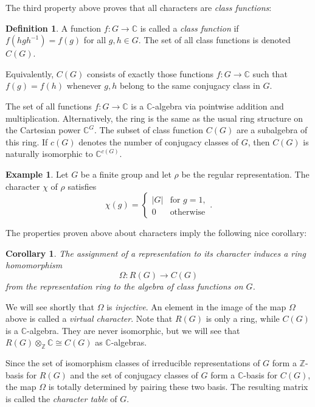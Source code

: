 \documentclass[12pt]{article}
\theoremstyle{plain}
\newtheorem{corollary}[theorem]{Corollary}
\theoremstyle{definition}
\newtheorem{definition}[theorem]{Definition}
\newtheorem{example}[theorem]{Example}
\theoremstyle{remark}
\numberwithin{equation}{section}
\begin{document}
The third property above proves that all characters are \emph{class
functions}:

\begin{definition}
A function $f : G \to \mathbb{C}$ is called a \emph{class function}
if $f(hgh^{-1})=f(g)$ for all $g,h \in G$.
The set of all class functions is denoted $C(G)$.
\end{definition}

Equivalently, $C(G)$ consists of exactly those functions $f : G \to
\mathbb{C}$ such that $f(g)=f(h)$ whenever $g, h$ belong to the
same conjugacy class in $G$.

The set of all functions $f : G \to \mathbb{C}$ is a
$\mathbb{C}$-algebra via pointwise addition and multiplication.
Alternatively, the ring is the same as the usual ring structure on the
Cartesian power $\mathbb{C}^G$.
The subset of class function $C(G)$ are a subalgebra of this ring.
If $c(G)$ denotes the number of conjugacy classes of $G$,
then $C(G)$ is naturally isomorphic to $\mathbb{C}^{c(G)}$.

\begin{example}
Let $G$ be a finite group and let $\rho$ be the regular representation.
The character $\chi$ of $\rho$ satisfies
\[
\chi(g) = \begin{cases}
|G| & \textrm{for $g=1$},\\
0 & \textrm{otherwise}
\end{cases} .
\]
\end{example}

The properties proven above about characters imply the following nice
corollary:

\begin{corollary}
The assignment of a representation to its character
induces a ring homomorphism
\[
\Omega: R(G) \to C(G)
\]
from the representation ring to the algebra of class functions on $G$.
\end{corollary}

We will see shortly that $\Omega$ is \emph{injective}.
An element in the image of the map $\Omega$ above is called a \emph{virtual
character}.  Note that $R(G)$ is only a ring, while $C(G)$ is a
$\mathbb{C}$-algebra.  They are never isomorphic, but we will see that
$R(G) \otimes_\mathbb{Z} \mathbb{C} \cong C(G)$ as $\mathbb{C}$-algebras.

Since the set of isomorphism classes of irreducible representations of
$G$ form a $\mathbb{Z}$-basis for $R(G)$
and the set of conjugacy classes of $G$
form a $\mathbb{C}$-basis for $C(G)$,
the map $\Omega$ is totally determined by pairing these two basis.
The resulting matrix is called the \emph{character table} of $G$.
\end{document}
